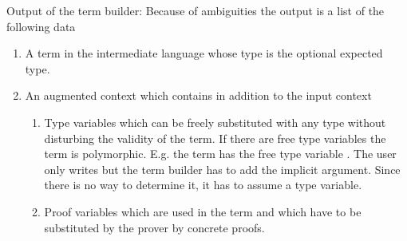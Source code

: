 Output of the term builder: Because of ambiguities the output is a list of the
following data
%
\begin{enumerate}

\item A term in the intermediate language whose type is the optional expected
  type.

\item An augmented context which contains in addition to the input context
  \begin{enumerate}
  \item Type variables which can be freely substituted with any type without
    disturbing the validity of the term. If there are free type variables the
    term is polymorphic. E.g. the term  has the free type variable
    . The user only writes  but the term builder has to
    add the implicit argument. Since there is no way to determine it, it has
    to assume a type variable.
  \item Proof variables which are used in the term and which have to be
    substituted by the prover by concrete proofs.
  \end{enumerate}
\end{enumerate}


